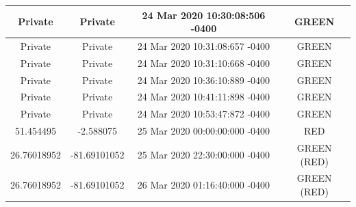 \documentclass{article}
\begin{document}
\begin{longtable}[c]{| c | c | c | c |}
    	\hline
             {Private} & {Private} & {24 Mar 2020 10:30:08:506 -0400} & {GREEN} \\ 
    	\hline
             {Private} & {Private} & {24 Mar 2020 10:31:08:657 -0400} & {GREEN} \\ 
    	\hline
             {Private} & {Private} & {24 Mar 2020 10:31:10:668 -0400} & {GREEN} \\ 
    	\hline
             {Private} & {Private} & {24 Mar 2020 10:36:10:889 -0400} & {GREEN} \\ 
    	\hline
             {Private} & {Private} & {24 Mar 2020 10:41:11:898 -0400} & {GREEN} \\ 
    	\hline
             {Private} & {Private} & {24 Mar 2020 10:53:47:872 -0400} & {GREEN} \\ 
    	\hline
             {51.454495} & {-2.588075} & {25 Mar 2020 00:00:00:000 -0400} & {RED} \\ 
    	\hline
             {26.76018952} & {-81.69101052} & {25 Mar 2020 22:30:00:000 -0400} & {GREEN (RED)} \\ 
    	\hline
             {26.76018952} & {-81.69101052} & {26 Mar 2020 01:16:40:000 -0400} & {GREEN (RED)} \\ 
    	\hline
     \end{longtable}

\pagebreak
\end{document}
